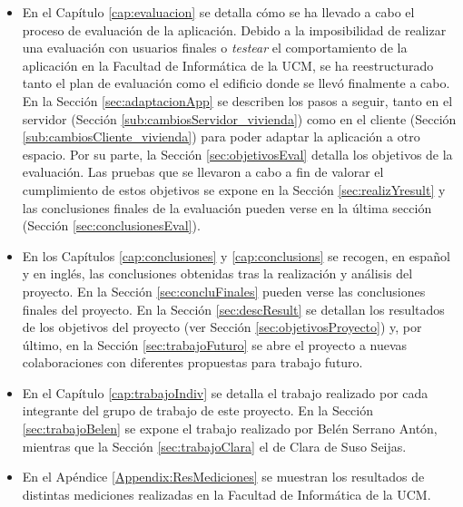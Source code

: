 \begin{itemize}
	\item En el Capítulo \ref{cap:evaluacion} se detalla cómo se ha llevado a cabo el proceso de evaluación de la aplicación. Debido a la imposibilidad de realizar una evaluación con usuarios finales o \textit{testear} el comportamiento de la aplicación en la Facultad de Informática de la UCM, se ha reestructurado tanto el plan de evaluación como el edificio donde se llevó finalmente a cabo. En la Sección \ref{sec:adaptacionApp} se describen los pasos a seguir, tanto en el servidor (Sección \ref{sub:cambiosServidor_vivienda}) como en el cliente (Sección \ref{sub:cambiosCliente_vivienda}) para poder adaptar la aplicación a otro espacio. Por su parte, la Sección \ref{sec:objetivosEval} detalla los objetivos de la evaluación. Las pruebas que se llevaron a cabo a fin de valorar el cumplimiento de estos objetivos se expone en la Sección \ref{sec:realizYresult} y las conclusiones finales de la evaluación pueden verse en la última sección (Sección \ref{sec:conclusionesEval}).
	
	\item En los Capítulos \ref{cap:conclusiones} y \ref{cap:conclusions} se recogen, en español y en inglés, las conclusiones obtenidas tras la realización y análisis del proyecto. En la Sección \ref{sec:concluFinales} pueden verse las conclusiones finales del proyecto. En la Sección \ref{sec:descResult} se detallan los resultados de los objetivos del proyecto (ver Sección \ref{sec:objetivosProyecto}) y, por último, en la Sección \ref{sec:trabajoFuturo} se abre el proyecto a nuevas colaboraciones con diferentes propuestas para trabajo futuro.

	\item En el Capítulo \ref{cap:trabajoIndiv} se detalla el trabajo realizado por cada integrante del grupo de trabajo de este proyecto. En la Sección \ref{sec:trabajoBelen} se expone el trabajo realizado por Belén Serrano Antón, mientras que la Sección \ref{sec:trabajoClara} el de Clara de Suso Seijas.
	
	\item En el Apéndice \ref{Appendix:ResMediciones} se muestran los resultados de distintas mediciones realizadas en la Facultad de Informática de la UCM.
	
\end{itemize}

